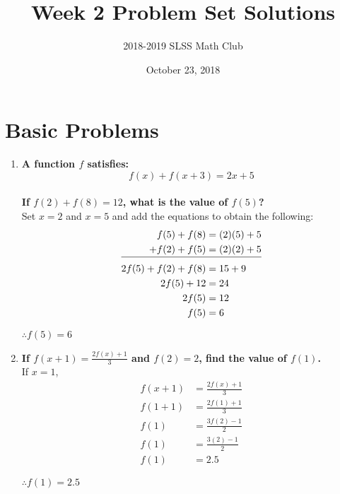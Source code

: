 \documentclass[12pt]{article}
\title{Week 2 Problem Set Solutions\vspace{-3mm}}
\author{2018-2019 SLSS Math Club\vspace{-5mm}}
\date{October 23, 2018 \vspace{-5mm}}
\begin{document}
\maketitle

\section*{Basic Problems}
\begin{enumerate}
    \item \textbf{A function $f$ satisfies: \\ $$f(x) + f(x + 3) = 2x + 5$$ \\ If $f(2) + f(8) = 12$, what is the value of $f(5)$?} \\
    
    Set $x = 2$ and $x = 5$ and add the equations to obtain the following:
    \begin{align*}
        f(5)+f(8)&=(2)(5)+5 \\
        + f(2)+f(5)&=(2)(2)+5 \\[-10pt]
        \cline{1-2}
        2f(5)+f(2)+f(8)&=15+9 \\
        2f(5)+12&=24 \\
        2f(5)&=12 \\
        f(5)&=6
    \end{align*}
    
    $\therefore f(5) = 6$

    \item \textbf{If $f(x+1)=\frac{2f(x)+1}{3}$ and $f(2) = 2$, find the value of $f(1)$.} \\
    
    If $x = 1$,
    \begin{align*}
        f(x+1)&=\frac{2f(x)+1}{3} \\
        f(1 + 1)&=\frac{2f(1)+1}{3} \\
        f(1)&=\frac{3f(2)-1}{2} \\
        f(1)&=\frac{3(2)-1}{2} \\
        f(1)&=2.5
    \end{align*}
    
    $\therefore f(1) = 2.5$
    
\end{enumerate} \newpage
\end{document}
